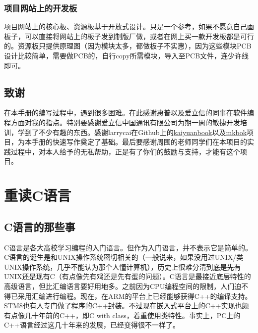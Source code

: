 \documentclass[a4paper]{book}
\makeatletter
\let\savedtitle=\@title
\renewcommand{\headrulewidth}{0pt}
\newcounter{tab}[chapter]
\newcommand{\chap}[1]{\newpage\thispagestyle{empty}\chapter{#1}\label{chap:\thechapter}}
\makeatother
\begin{document}
\subsection*{项目网站上的开发板}

项目网站上的核心板、资源板基于开放式设计。只是一个参考，如果不愿意自己画板子，可以直接将网站上的板子发到制版厂做，或者在网上买一款开发板都是可行的。资源板只提供原理图（因为模块太多，都做板子不实惠），因为这些模块PCB设计比较简单，需要做PCB的，自行copy所需模块，导入至PCB文件，连少许线即可。

\section*{致谢}

在本手册的编写过程中，遇到很多困难。在此感谢惠普以及爱立信的同事在软件编程方面对我的指点。特别要感谢爱立信中国通讯有限公司为期一周的敏捷开发培训，学到了不少有趣的东西。感谢larrycai在Github上的\href{www.github.com/larrycai/kaiyuanbook}{kaiyuanbook}以及\href{www.github.com/larrycai/mkbok}{mkbok}项目，为本手册的快速写作奠定了基础。最后要感谢周围的老师同学们在本项目的实践过程中，对本人给予的无私帮助，正是有了你们的鼓励与支持，才能有这个项目。

\tableofcontents\newpage\thispagestyle{empty}


\fancyhf{}
\fancyhead[LE]{\color{colorheader}\quad\small\textbf\thepage\quad\quad\small\leftmark}
\fancyhead[RO]{\color{colorheader}\small\rightmark\quad\quad\small\textbf\thepage\quad}

\pagestyle{fancy}

\mainmatter
\chap{重读C语言}

\section{C语言的那些事}

C语言是各大高校学习编程的入门语言。但作为入门语言，并不表示它是简单的。C语言的诞生是和UNIX操作系统密切相关的（一般说来，如果没用过UNIX/类UNIX操作系统，几乎不能认为那个人懂计算机），历史上很难分清到底是先有UNIX还是现有C（有点像先有鸡还是先有蛋的问题）。C语言是最接近底层特性的高级语言，但比汇编语言要好用地多。之前因为CPU编程空间的限制，人们迫不得已采用汇编进行编程。现在，在ARM的平台上已经能够获得C++的编译支持。STM8也有人专门做了程序的C++封装。不过现在嵌入式平台上的C++实现也颇有点像几十年前的C++，即C with class，着重使用类特性。事实上，PC上的C++语言经过这几十年来的发展，已经变得很不一样了。
\end{document}
